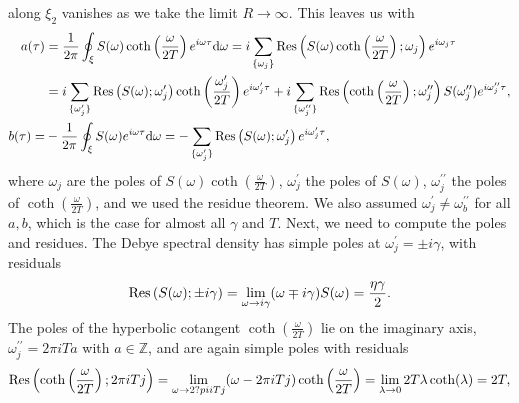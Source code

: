 along $\xi_2$ vanishes as we take the limit $R\rightarrow\infty$. This leaves us with
\begin{equation*}
    \begin{split}
        a(\tau) &= \frac{1}{2\pi}\oint_\xi S(\omega)\coth\left(
        \frac{\omega}{2T}
        \right)e^{i\omega\tau} \text{d}\omega = i\sum_{\{\omega_j\}}\Residue\left(
            S(\omega)\coth\left(
                \frac{\omega}{2T}
            \right); \omega_j
        \right)e^{i\omega_j\tau}\\
        &= i\sum_{\{\omega_j^\prime\}} \Residue\left(
            S(\omega); \omega_j^\prime
            \right) \coth\left(
                \frac{\omega_j^\prime}{2T}
            \right)e^{i\omega_j^\prime\tau} + 
            i\sum_{\{\omega_j^{\prime\prime}\}} \Residue\left(
            \coth\left(
                \frac{\omega}{2T}
            \right); \omega_j^{\prime\prime}
            \right) S(\omega_j^{\prime\prime}) e^{i\omega_j^{\prime\prime}\tau}, \\
        b(\tau) =& -\frac{1}{2\pi} \oint_\xi S(\omega) e^{i\omega\tau} \text{d}\omega =
    -\sum_{\{\omega_j^\prime\}} \Residue\left(
            S(\omega); \omega_j^\prime
            \right) e^{i\omega_j^\prime\tau},
    \end{split}
\end{equation*}
where $\omega_j$ are the poles of $S(\omega)\coth\left(\frac{\omega}{2T}\right)$,
$\omega_j^\prime$ the poles of $S(\omega)$, $\omega_j^{\prime\prime}$ the poles of
$\coth\left(\frac{\omega}{2T}\right)$, and we used the residue theorem. We also
assumed $\omega_j^\prime \neq \omega_b^{\prime\prime}$ for all $a, b$, which is the case for almost all $\gamma$ and $T$. Next, we need to compute
the poles and residues. The Debye spectral density has simple poles at $\omega_j^\prime=\pm i\gamma$,
with residuals
\begin{equation*}
    \Residue\left(S(\omega);\pm i\gamma\right) = \lim_{\omega\rightarrow i\gamma}(\omega\mp i\gamma)S(\omega) = \frac{\eta\gamma}{2}.
\end{equation*}
The poles of the hyperbolic cotangent $\coth\left(\frac{\omega}{2T}\right)$ lie on the imaginary axis, $\omega_j^{\prime\prime} = 2\pi iTa$ with $a\in\mathbb{Z}$,
and are again simple poles with residuals
\begin{equation*}
    \Residue\left(\coth\left(\frac{\omega}{2T}\right);2\pi iTj\right) =
    \lim_{\omega\rightarrow 2?pi iTj} (\omega-2\pi iTj) \coth\left(
        \frac{\omega}{2T}
    \right) = \lim_{\lambda\rightarrow 0} 2T\lambda\coth(\lambda) = 2T,
\end{equation*}
